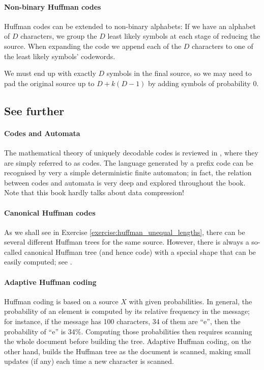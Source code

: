 \documentclass[a4paper, 11pt, openany]{article}
\numberwithin{equation}{section}
\theoremstyle{plain}
\theoremstyle{definition}
\begin{document}
\paragraph{Non-binary Huffman codes}

Huffman codes can be extended to non-binary alphabets: If we have an alphabet of $D$ characters, we group the $D$ least likely symbols at each stage of reducing the source. When expanding the code we append each of the $D$ characters to one of the least likely symbols’ codewords.

We must end up with exactly $D$ symbols in the final source, so we may need to pad the original source up to $D+k(D-1)$ by adding symbols of probability $0$.

\subsection{See further}

\paragraph{Codes and Automata} The mathematical theory of uniquely decodable codes is reviewed in \cite{BPR10}, where they are simply referred to as codes. The language generated by a prefix code can be recognised by very a simple deterministic finite automaton; in fact, the relation between codes and automata is very deep and explored throughout the book. Note that this book hardly talks about data compression!

\paragraph{Canonical Huffman codes} As we shall see in Exercise \ref{exercise:huffman_unequal_lengths}, there can be several different Huffman trees for the same source. However, there is always a so-called canonical Huffman tree (and hence code) with a special shape that can be easily computed; see \cite[3.2.2]{Say12}.

\paragraph{Adaptive Huffman coding} Huffman coding is based on a source $X$ with given probabilities. In general, the probability of an element is computed by its relative frequency in the message; for instance, if the message has 100 characters, 34 of them are ``e'', then the probability of ``e'' is 34\%. Computing those probabilities then requires scanning the whole document before building the tree. Adaptive Huffman coding, on the other hand, builds the Huffman tree as the document is scanned, making small updates (if any) each time a new character is scanned.
\end{document}
